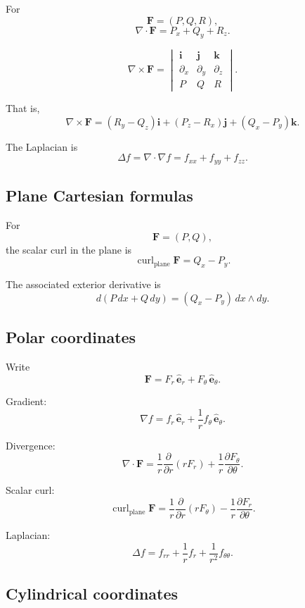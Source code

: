For
\[
    \mathbf F=(P,Q,R),
\]
\[
\boxed{
    \nabla\cdot\mathbf F
    =
    P_x+Q_y+R_z.
}
\]

\[
\boxed{
    \nabla\times\mathbf F
    =
    \begin{vmatrix}
    \mathbf i&\mathbf j&\mathbf k\\
    \partial_x&\partial_y&\partial_z\\
    P&Q&R
    \end{vmatrix}.
}
\]

That is,
\[
\boxed{
    \nabla\times\mathbf F
    =
    (R_y-Q_z)\mathbf i
    +(P_z-R_x)\mathbf j
    +(Q_x-P_y)\mathbf k.
}
\]

The Laplacian is
\[
\boxed{
    \Delta f
    =
    \nabla\cdot\nabla f
    =
    f_{xx}+f_{yy}+f_{zz}.
}
\]

\subsection*{Plane Cartesian formulas}

For
\[
    \mathbf F=(P,Q),
\]
the scalar curl in the plane is
\[
\boxed{
    \operatorname{curl}_{\mathrm{plane}}\mathbf F
    =
    Q_x-P_y.
}
\]

The associated exterior derivative is
\[
\boxed{
    d(P\,dx+Q\,dy)
    =
    (Q_x-P_y)\,dx\wedge dy.
}
\]

\subsection*{Polar coordinates}

Write
\[
    \mathbf F
    =
    F_r\,\widehat{\mathbf e}_r
    +
    F_\theta\,\widehat{\mathbf e}_\theta.
\]

Gradient:
\[
\boxed{
    \nabla f
    =
    f_r\,\widehat{\mathbf e}_r
    +
    \frac1r f_\theta\,\widehat{\mathbf e}_\theta.
}
\]

Divergence:
\[
\boxed{
    \nabla\cdot\mathbf F
    =
    \frac1r\frac{\partial}{\partial r}(rF_r)
    +
    \frac1r\frac{\partial F_\theta}{\partial\theta}.
}
\]

Scalar curl:
\[
\boxed{
    \operatorname{curl}_{\mathrm{plane}}\mathbf F
    =
    \frac1r\frac{\partial}{\partial r}(rF_\theta)
    -
    \frac1r\frac{\partial F_r}{\partial\theta}.
}
\]

Laplacian:
\[
\boxed{
    \Delta f
    =
    f_{rr}
    +
    \frac1r f_r
    +
    \frac1{r^2}f_{\theta\theta}.
}
\]

\subsection*{Cylindrical coordinates}

